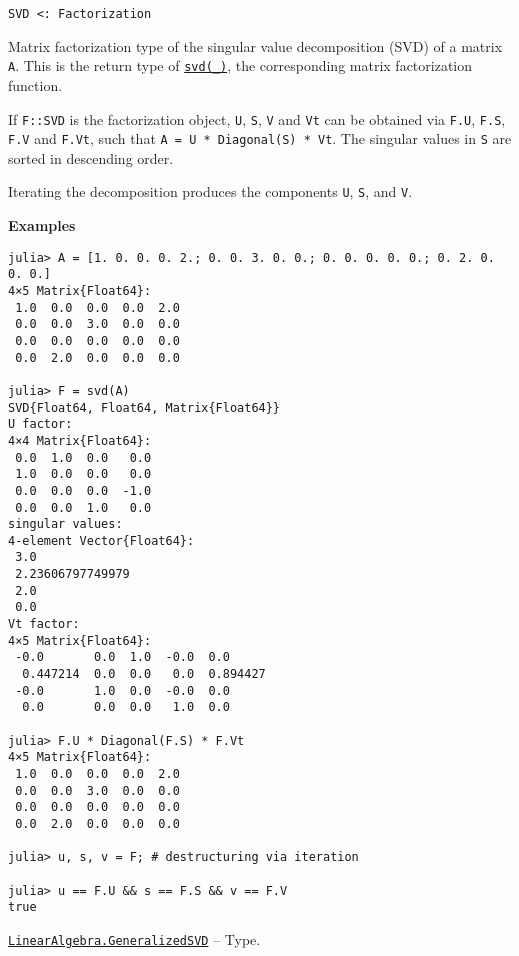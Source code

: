 \begin{adjustwidth}{2em}{0pt}


\begin{verbatim}
SVD <: Factorization
\end{verbatim}

Matrix factorization type of the singular value decomposition (SVD) of a matrix \texttt{A}. This is the return type of \hyperlink{6661056220970412040}{\texttt{svd(\_)}}, the corresponding matrix factorization function.

If \texttt{F::SVD} is the factorization object, \texttt{U}, \texttt{S}, \texttt{V} and \texttt{Vt} can be obtained via \texttt{F.U}, \texttt{F.S}, \texttt{F.V} and \texttt{F.Vt}, such that \texttt{A = U * Diagonal(S) * Vt}. The singular values in \texttt{S} are sorted in descending order.

Iterating the decomposition produces the components \texttt{U}, \texttt{S}, and \texttt{V}.

\textbf{Examples}


\begin{verbatim}
julia> A = [1. 0. 0. 0. 2.; 0. 0. 3. 0. 0.; 0. 0. 0. 0. 0.; 0. 2. 0. 0. 0.]
4×5 Matrix{Float64}:
 1.0  0.0  0.0  0.0  2.0
 0.0  0.0  3.0  0.0  0.0
 0.0  0.0  0.0  0.0  0.0
 0.0  2.0  0.0  0.0  0.0

julia> F = svd(A)
SVD{Float64, Float64, Matrix{Float64}}
U factor:
4×4 Matrix{Float64}:
 0.0  1.0  0.0   0.0
 1.0  0.0  0.0   0.0
 0.0  0.0  0.0  -1.0
 0.0  0.0  1.0   0.0
singular values:
4-element Vector{Float64}:
 3.0
 2.23606797749979
 2.0
 0.0
Vt factor:
4×5 Matrix{Float64}:
 -0.0       0.0  1.0  -0.0  0.0
  0.447214  0.0  0.0   0.0  0.894427
 -0.0       1.0  0.0  -0.0  0.0
  0.0       0.0  0.0   1.0  0.0

julia> F.U * Diagonal(F.S) * F.Vt
4×5 Matrix{Float64}:
 1.0  0.0  0.0  0.0  2.0
 0.0  0.0  3.0  0.0  0.0
 0.0  0.0  0.0  0.0  0.0
 0.0  2.0  0.0  0.0  0.0

julia> u, s, v = F; # destructuring via iteration

julia> u == F.U && s == F.S && v == F.V
true
\end{verbatim}



\end{adjustwidth}
\hypertarget{16156328526785145806}{}
\hyperlink{16156328526785145806}{\texttt{LinearAlgebra.GeneralizedSVD}}  -- {Type.}

